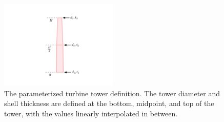 \documentclass[wes, manuscript]{copernicus}
\providecommand{\DIFaddbegin}{} %
\providecommand{\DIFaddend}{} %
\providecommand{\DIFaddbeginFL}{} %
\providecommand{\DIFaddendFL}{} %
\providecommand{\DIFdelbeginFL}{} %
\providecommand{\DIFdelendFL}{} %
\begin{document}
\begin{figure}[htbp]
  \centering
  \DIFdelbeginFL %
\DIFdelendFL \DIFaddbeginFL \includegraphics[width=0.5\textwidth]{Figures/tower_param.pdf}
  \DIFaddendFL \caption{\label{tower_def} The parameterized turbine tower definition. The tower diameter and shell thickness are defined at the bottom, midpoint, and top of the tower, with the values linearly interpolated in between.}
\end{figure}

\DIFaddbegin 
\DIFaddend 
\end{document}
